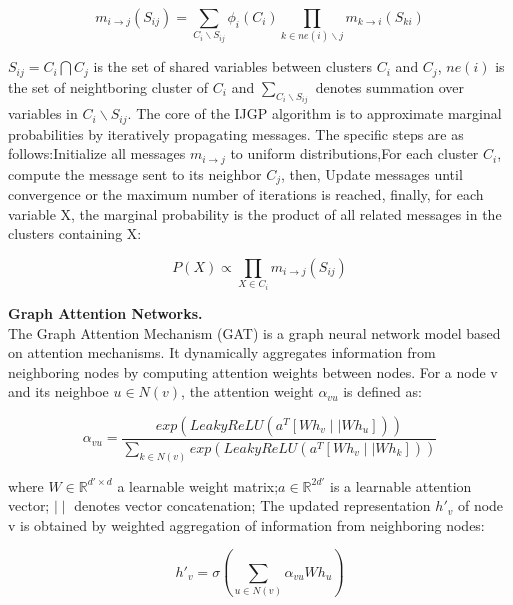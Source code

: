 \begin{equation}
m_{i\rightarrow j}(S_{ij})=\sum\limits_{C_i\backslash S_{ij}}\phi_i(C_i)\prod\limits_{k\in ne(i)\backslash j}
m_{k\rightarrow i}(S_{ki})
\end{equation}

\(S_{ij}=C_i\bigcap C_j\) is the set of shared variables between clusters \(C_i\) and \(C_j\),  \(ne(i)\) is the set of 
neightboring cluster of \(C_i\) and \(\sum\limits_{C_i\backslash S_{ij}}\) denotes summation over variables in \(C_i\backslash S_{ij}\).
The core of the IJGP algorithm is to approximate marginal probabilities by iteratively propagating messages. The specific steps 
are as follows:Initialize all messages \(m_{i\rightarrow j}\) to uniform distributions,For each cluster \(C_i\), compute the message 
sent to its neighbor \(C_j\), then, Update messages until convergence or the maximum number of iterations is reached, finally, for 
each variable X, the marginal probability is the product of all related messages in the clusters containing X:

\begin{equation}
P(X)\propto\prod\limits_{X\in C_i}m_{i\rightarrow j}(S_{ij})
\end{equation}

\textbf{Graph Attention Networks.}\\
The Graph Attention Mechanism (GAT) is a graph neural network model based on attention mechanisms. It dynamically aggregates 
information from neighboring nodes by computing attention weights between nodes.
For a node v and its neighboe \(u \in N(v)\), the attention weight \(\alpha_{vu}\) is defined as:

\begin{equation}
\alpha_{vu}=\frac{exp(LeakyReLU(a^T[Wh_v\mid\mid Wh_u]))}{\sum\limits_{k\in N(v)}exp(LeakyReLU(a^T[Wh_v\mid\mid Wh_k]))}
\end{equation}

where \(W\in \mathbb{R}^{d'\times d}\) a learnable weight matrix;\(a\in \mathbb{R}^{2d'}\) is a learnable attention vector; 
\(\mid\mid\) denotes vector concatenation; 
The updated representation \(h'_v\) of node v is obtained by weighted aggregation of information from neighboring nodes:

\begin{equation}
h'_v=\sigma(\sum\limits_{u\in N(v)}\alpha_{vu} Wh_u)
\end{equation}
